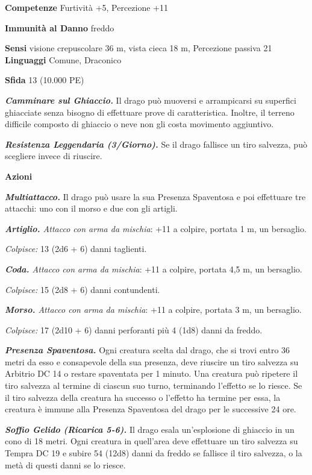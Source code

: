 \begin{multicols}{2}
\textbf{Competenze} Furtività +5, Percezione +11

\textbf{Immunità al Danno} freddo

\textbf{Sensi} visione crepuscolare 36 m, vista cieca 18 m, Percezione passiva
21 \textbf{Linguaggi} Comune, Draconico

\textbf{Sfida} 13 (10.000 PE)\smallskip

\emph{\textbf{Camminare sul Ghiaccio.}} Il drago può muoversi e
arrampicarsi su superfici ghiacciate senza bisogno di effettuare prove
di caratteristica. Inoltre, il terreno difficile composto di ghiaccio o
neve non gli costa movimento aggiuntivo.

\emph{\textbf{Resistenza Leggendaria (3/Giorno).}} Se il drago fallisce
un tiro salvezza, può scegliere invece di riuscire.

\smallskip\textbf{Azioni}

\emph{\textbf{Multiattacco.}} Il drago può usare la sua Presenza
Spaventosa e poi effettuare tre attacchi: uno con il morso e due con gli
artigli.

\emph{\textbf{Artiglio.} Attacco con arma da mischia}: +11 a colpire,
portata 1 m, un bersaglio.

\emph{Colpisce:} 13 (2d6 + 6) danni taglienti.

\emph{\textbf{Coda.} Attacco con arma da mischia}: +11 a colpire,
portata 4,5 m, un bersaglio.

\emph{Colpisce:} 15 (2d8 + 6) danni contundenti.

\emph{\textbf{Morso.} Attacco con arma da mischia}: +11 a colpire,
portata 3 m, un bersaglio.

\emph{Colpisce:} 17 (2d10 + 6) danni perforanti più 4 (1d8) danni da
freddo.

\emph{\textbf{Presenza Spaventosa.}} Ogni creatura scelta dal drago, che
si trovi entro 36 metri da esso e consapevole della sua presenza, deve
riuscire un tiro salvezza su Arbitrio DC 14 o restare spaventata per 1
minuto. Una creatura può ripetere il tiro salvezza al termine di ciascun
suo turno, terminando l'effetto se lo riesce. Se il tiro salvezza della
creatura ha successo o l'effetto ha termine per essa, la creatura è
immune alla Presenza Spaventosa del drago per le successive 24 ore.

\emph{\textbf{Soffio Gelido (Ricarica 5-6).}} Il drago esala
un'esplosione di ghiaccio in un cono di 18 metri. Ogni creatura in
quell'area deve effettuare un tiro salvezza su Tempra DC 19 e
subire 54 (12d8) danni da freddo se fallisce il tiro salvezza, o la metà
di questi danni se lo riesce.


\end{multicols}
